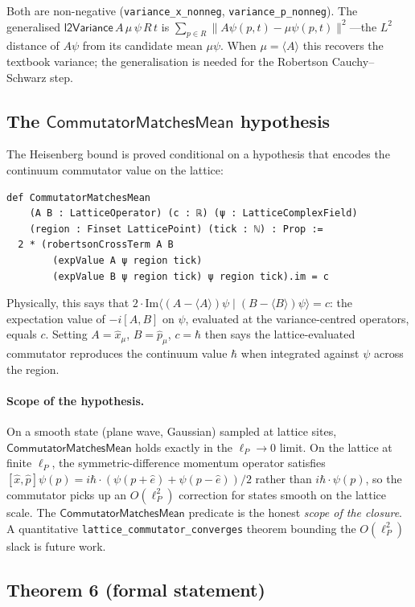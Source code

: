 \documentclass[11pt,a4paper,twoside]{article}
\theoremstyle{definition}
\newcommand{\lP}{\ell_P}
\newcommand{\CMM}{\mathsf{CommutatorMatchesMean}}
\newcommand{\xhat}{\hat{x}}
\newcommand{\phat}{\hat{p}}
\newcommand{\code}[1]{\texttt{#1}}
\begin{document}
Both are non-negative
(\code{variance\_x\_nonneg}, \code{variance\_p\_nonneg}). The
generalised $\mathsf{l2Variance}\,A\,\mu\,\psi\,R\,t$ is
$\sum_{p\in R}\|A\psi(p,t)-\mu\psi(p,t)\|^{2}$---the $L^{2}$ distance
of $A\psi$ from its candidate mean $\mu\psi$. When $\mu=\langle A\rangle$
this recovers the textbook variance; the generalisation is needed for
the Robertson Cauchy--Schwarz step.

\subsection{The
\texorpdfstring{$\CMM$}{CommutatorMatchesMean} hypothesis}\label{sec:CMM}

The Heisenberg bound is proved conditional on a hypothesis that
encodes the continuum commutator value on the lattice:
\begin{lstlisting}
def CommutatorMatchesMean
    (A B : LatticeOperator) (c : ℝ) (ψ : LatticeComplexField)
    (region : Finset LatticePoint) (tick : ℕ) : Prop :=
  2 * (robertsonCrossTerm A B
        (expValue A ψ region tick)
        (expValue B ψ region tick) ψ region tick).im = c
\end{lstlisting}

Physically, this says that
$2\cdot\mathrm{Im}\langle(A-\langle A\rangle)\psi\mid(B-\langle B\rangle)\psi\rangle=c$:
the expectation value of $-i[A,B]$ on $\psi$, evaluated at the
variance-centred operators, equals $c$. Setting $A=\xhat_{\mu}$,
$B=\phat_{\mu}$, $c=\hbar$ then says the lattice-evaluated commutator
reproduces the continuum value $\hbar$ when integrated against $\psi$
across the region.

\paragraph{Scope of the hypothesis.}
On a smooth state (plane wave, Gaussian) sampled at lattice sites,
$\CMM$ holds exactly in the $\lP\to 0$ limit. On the lattice at
finite $\lP$, the symmetric-difference momentum operator satisfies
$[\xhat,\phat]\psi(p)=i\hbar\cdot(\psi(p+\hat e)+\psi(p-\hat e))/2$
rather than $i\hbar\cdot\psi(p)$, so the commutator picks up an
$O(\lP^{2})$ correction for states smooth on the lattice scale. The
$\CMM$ predicate is the honest \emph{scope of the closure}. A
quantitative \code{lattice\_commutator\_converges} theorem bounding
the $O(\lP^{2})$ slack is future work.

\subsection{Theorem 6 (formal statement)}\label{sec:T6}
\end{document}
